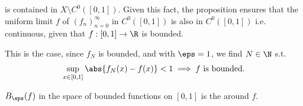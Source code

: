 \begin{solution}
\begin{enumerate}
    is contained in $X \setminus C^0([0,1])$. Given this fact, the  proposition ensures that the uniform limit $f$ of $(f_n)_{n=0}^\infty$ in $C^0([0,1])$ is also in $C^0([0,1])$ i.e. continuous, given that $f:[0,1] \to \R$ is bounded.
    
    This is the case, since $f_N$ is bounded, and with $\eps = 1$, we find $N \in \N$ s.t.
    \[ \sup_{x \in [0,1]} \abs{f_N(x) - f(x)} < 1 \implies f \text{ is bounded.} \]
    
    $B_\eps(f)$ in the space of bounded functions on $[0,1]$ is the  around $f$.
\end{enumerate}
\end{solution}
